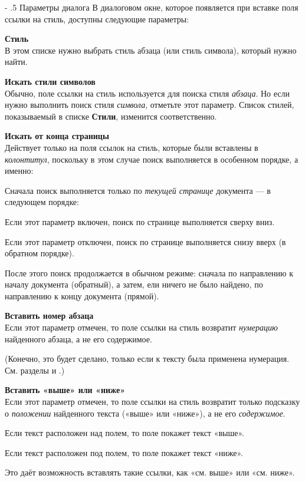 ﻿\documentclass[a4paper,10pt]{article}
\makeatletter
\newenvironment{myindentpar}[1]%
 {\begin{list}{}%
         {\setlength{\leftmargin}{#1}}%
         \item[]%
 }
 {\end{list}}
\renewcommand\paragraph{%
   \@startsection{paragraph}{4}{0mm}%
      {-\baselineskip}%
      {.5\baselineskip}%
      {\normalfont\normalsize\bfseries}}
\makeatother
\begin{document}
\paragraph{Параметры диалога}
В диалоговом окне, которое появляется при вставке поля ссылки на стиль, доступны следующие параметры:
\begin{itemize}
 \item \textbf{Стиль}\\
 В этом списке нужно выбрать стиль абзаца (или стиль символа), который нужно найти.
 \item \textbf{Искать стили символов}\\
 Обычно, поле ссылки на стиль используется для поиска стиля \textit{абзаца}. Но если нужно выполнить поиск стиля \textit{символа}, отметьте этот параметр. Список стилей, показываемый в списке \textbf{Стили}, изменится соответственно.
 \item \textbf{Искать от конца страницы}\\
 Действует только на поля ссылок на стиль, которые были вставлены в \textit{колонтитул}, поскольку в этом случае поиск выполняется в особенном порядке, а именно:
 
 Сначала поиск выполняется только по \textit{текущей странице} документа — в следующем порядке:
 \begin{myindentpar}{1cm}
 Если этот параметр включен, поиск по странице выполняется сверху вниз.
 
 Если этот параметр отключен, поиск по странице выполняется снизу вверх (в обратном порядке).
\end{myindentpar}

После этого поиск продолжается в обычном режиме: сначала по направлению к началу документа (обратный), а затем, ели ничего не было найдено, по направлению к концу документа (прямой).
\item \textbf{Вставить номер абзаца}\\
Если этот параметр отмечен, то поле ссылки на стиль возвратит \textit{нумерацию} найденного абзаца, а не его содержимое.

(Конечно, это будет сделано, только если к тексту была применена нумерация. См. разделы  и .)
\item \textbf{Вставить «выше» или «ниже»}\\
Если этот параметр отмечен, то поле ссылки на стиль возвратит только подсказку о \textit{положении} найденного текста («выше» или «ниже»), а не его \textit{содержимое}.
\begin{myindentpar}{1cm}
 Если текст расположен над полем, то поле покажет текст «выше».
 
 Если текст расположен под полем, то поле покажет текст «ниже».
\end{myindentpar}

Это даёт возможность вставлять такие ссылки, как «см. выше» или «см. ниже».
\end{itemize}
\end{document}
